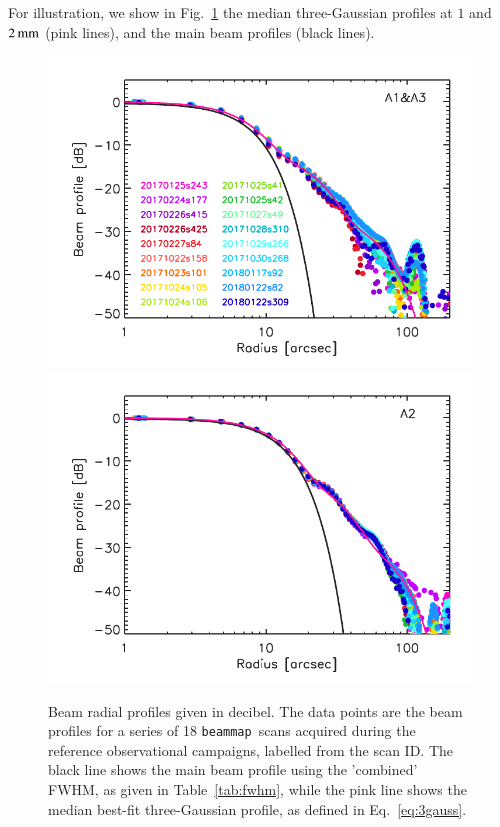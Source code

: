 \documentclass[traditionalabstract]{aa}
\newcommand{\bm}{{\tt beammap}}
\newcommand{\lp}[1]{#1}
\begin{document}
{\lp For illustration, we show in
Fig.~\ref{fig:beam_prof} the median 
three-Gaussian profiles at $1$ and $2\,\rm{mm}$ (pink lines), and
the main beam profiles (black lines). }


\begin{figure}[!thbp]
  \centering
   \includegraphics[clip, width=\linewidth]{Figures/plot_profiles_dB_1mm.pdf}
   \includegraphics[clip, width=\linewidth]{Figures/plot_profiles_dB_a2.pdf}
  \caption[Stability of the beam profile]{{\lp Beam radial
    profiles given in decibel. %
    The data points are the beam profiles for a series of 18
    \bm\ scans acquired during the reference observational campaigns, labelled from the scan
    ID. The black line shows the main beam profile using the 'combined'
    FWHM, as given in Table~\ref{tab:fwhm}, while the pink
    line shows the median best-fit three-Gaussian profile, as defined
    in Eq.~\ref{eq:3gauss}.}}
  \label{fig:beam_prof}
\end{figure}
\end{document}
